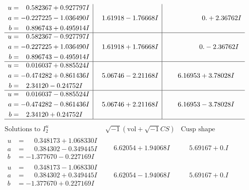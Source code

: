 \documentclass[1p]{elsarticle_modified}
\theoremstyle{definition}
\newcommand{\I}{\sqrt{-1}}
\begin{document}
$$\begin{array}{c|c|c}
\begin{aligned}
u &= \phantom{-}0.582367 + 0.927797 I \\
a &= -0.227225 - 1.036490 I \\
b &= \phantom{-}0.896743 + 0.495914 I\end{aligned}
 & \phantom{-}1.61918 - 1.76668 I & \phantom{-0.000000 -}0. + 2.36762 I \\ \hline\begin{aligned}
u &= \phantom{-}0.582367 - 0.927797 I \\
a &= -0.227225 + 1.036490 I \\
b &= \phantom{-}0.896743 - 0.495914 I\end{aligned}
 & \phantom{-}1.61918 + 1.76668 I & \phantom{-0.000000 } 0. - 2.36762 I \\ \hline\begin{aligned}
u &= \phantom{-}0.016037 + 0.885524 I \\
a &= -0.474282 + 0.861436 I \\
b &= \phantom{-}2.34120 - 0.24752 I\end{aligned}
 & \phantom{-}5.06746 - 2.21168 I & \phantom{-}6.16953 + 3.78028 I \\ \hline\begin{aligned}
u &= \phantom{-}0.016037 - 0.885524 I \\
a &= -0.474282 - 0.861436 I \\
b &= \phantom{-}2.34120 + 0.24752 I\end{aligned}
 & \phantom{-}5.06746 + 2.21168 I & \phantom{-}6.16953 - 3.78028 I\\
 \hline 
 \end{array}$$\newpage$$\begin{array}{c|c|c}  
\text{Solutions to }I^u_{2}& \I (\text{vol} + \sqrt{-1}CS) & \text{Cusp shape}\\
 \hline 
\begin{aligned}
u &= \phantom{-}0.348173 + 1.068330 I \\
a &= \phantom{-}0.384302 - 0.349445 I \\
b &= -1.377670 - 0.227169 I\end{aligned}
 & \phantom{-}6.62054 + 1.94068 I & \phantom{-}5.69167 + 0. I\phantom{ +0.000000I} \\ \hline\begin{aligned}
u &= \phantom{-}0.348173 - 1.068330 I \\
a &= \phantom{-}0.384302 + 0.349445 I \\
b &= -1.377670 + 0.227169 I\end{aligned}
 & \phantom{-}6.62054 - 1.94068 I & \phantom{-}5.69167 + 0. I\phantom{ +0.000000I} \\ \hline\begin{aligned}

\end{aligned}
\end{array}$$
\end{document}
